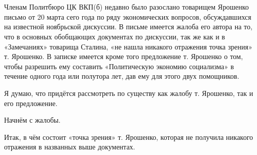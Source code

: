 \documentclass[12pt, a4paper, openany]{book}
\begin{document}
\newpage

\thispagestyle{empty} %

\ \\



\ \\



\ \\



\ \\



\ \\



\section[ОБ ОШИБКАХ т. ЯРОШЕНКО Л.Д.]{}



Членам Политбюро ЦК ВКП(б) недавно было разослано товарищем Ярошенко письмо от 20 марта сего года по ряду экономических вопросов, обсуждавшихся на известной ноябрьской дискуссии. В письме имеется жалоба его автора на то, что в основных обобщающих документах по дискуссии, так же как и в «Замечаниях» товарища Сталина, «не нашла никакого отражения точка зрения» т. Ярошенко. В записке имеется кроме того предложение т. Ярошенко о том, чтобы разрешить ему составить «Политическую экономию социализма» в течение одного года или полутора лет, дав ему для этого двух помощников.



Я думаю, что придётся рассмотреть по существу как жалобу т. Ярошенко, так и его предложение.



Начнём с жалобы.



Итак, в чём состоит «точка зрения» т. Ярошенко, которая не получила никакого отражения в названных выше документах.



\vspace{0.4cm}



\subsection[I. Главная ошибка т. Ярошенко]{}
\end{document}
